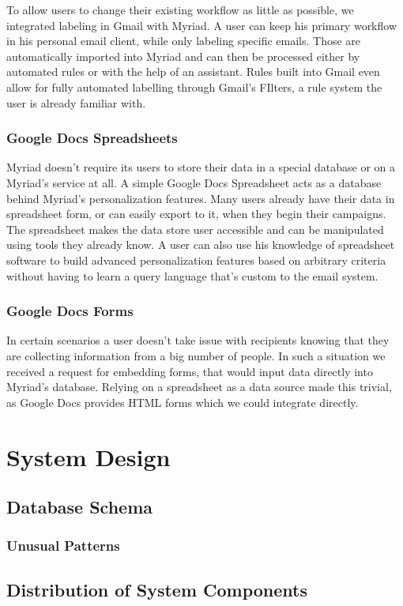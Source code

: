 To allow users to change their existing workflow as little as possible, we integrated labeling in Gmail with Myriad. A user can keep his primary workflow in his personal email client, while only labeling specific emails. Those are automatically imported into Myriad and can then be processed either by automated rules or with the help of an assistant. Rules built into Gmail even allow for fully automated labelling through Gmail’s FIlters, a rule system the user is already familiar with.

\subsubsection{Google Docs Spreadsheets}

Myriad doesn't require its users to store their data in a special database or on a Myriad's service at all. A simple Google Docs Spreadsheet acts as a database behind Myriad's personalization features. Many users already have their data in spreadsheet form, or can easily export to it, when they begin their campaigns. The spreadsheet makes the data store user accessible and can be manipulated using tools they already know. A user can also use his knowledge of spreadsheet software to build advanced personalization features based on arbitrary criteria without having to learn a query language that's custom to the email system.

\subsubsection{Google Docs Forms}

In certain scenarios a user doesn’t take issue with recipients knowing that they are collecting information from a big number of people. In such a situation we received a request for embedding forms, that would input data directly into Myriad’s database. Relying on a spreadsheet as a data source made this trivial, as Google Docs provides HTML forms which we could integrate directly.


\section{System Design}

\subsection{Database Schema}

\subsubsection{Unusual Patterns}

\subsection{Distribution of System Components}
